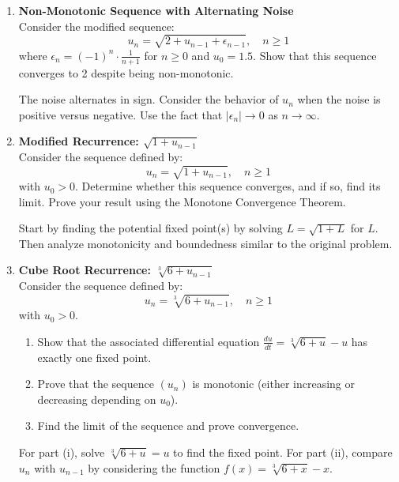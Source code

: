 \documentclass[12pt,a4paper]{article}
\theoremstyle{definition}
\begin{document}
\begin{enumerate}
    \item \textbf{Non-Monotonic Sequence with Alternating Noise}\\
    Consider the modified sequence:
    \[
    u_n = \sqrt{2 + u_{n-1} + \epsilon_{n-1}}, \quad n \geq 1
    \]
    where $\epsilon_n = (-1)^n \cdot \frac{1}{n+1}$ for $n \geq 0$ and $u_0 = 1.5$. Show that this sequence converges to 2 despite being non-monotonic.
    
    \begin{hint}
    The noise alternates in sign. Consider the behavior of $u_n$ when the noise is positive versus negative. Use the fact that $|\epsilon_n| \to 0$ as $n \to \infty$.
    \end{hint}
    
    \item \textbf{Modified Recurrence: $\sqrt{1 + u_{n-1}}$}\\
    Consider the sequence defined by:
    \[
    u_n = \sqrt{1 + u_{n-1}}, \quad n \geq 1
    \]
    with $u_0 > 0$. Determine whether this sequence converges, and if so, find its limit. Prove your result using the Monotone Convergence Theorem.
    
    \begin{hint}
    Start by finding the potential fixed point(s) by solving $L = \sqrt{1 + L}$ for $L$. Then analyze monotonicity and boundedness similar to the original problem.
    \end{hint}
    
    \item \textbf{Cube Root Recurrence: $\sqrt[3]{6 + u_{n-1}}$}\\
    Consider the sequence defined by:
    \[
    u_n = \sqrt[3]{6 + u_{n-1}}, \quad n \geq 1
    \]
    with $u_0 > 0$.
    \begin{enumerate}[label=\roman*)]
        \item Show that the associated differential equation $\frac{du}{dt} = \sqrt[3]{6 + u} - u$ has exactly one fixed point.
        \item Prove that the sequence $(u_n)$ is monotonic (either increasing or decreasing depending on $u_0$).
        \item Find the limit of the sequence and prove convergence.
    \end{enumerate}
    
    \begin{hint}
    For part (i), solve $\sqrt[3]{6 + u} = u$ to find the fixed point. For part (ii), compare $u_n$ with $u_{n-1}$ by considering the function $f(x) = \sqrt[3]{6 + x} - x$.
    \end{hint}
    

\end{enumerate}
\end{document}
